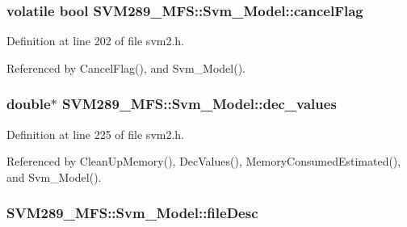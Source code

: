 \subsubsection[{\texorpdfstring{cancel\+Flag}{cancelFlag}}]{\setlength{\rightskip}{0pt plus 5cm}volatile bool S\+V\+M289\+\_\+\+M\+F\+S\+::\+Svm\+\_\+\+Model\+::cancel\+Flag}\hypertarget{struct_s_v_m289___m_f_s_1_1_svm___model_a01645368f6800875543d69ce8731d692}{}\label{struct_s_v_m289___m_f_s_1_1_svm___model_a01645368f6800875543d69ce8731d692}


Definition at line 202 of file svm2.\+h.



Referenced by Cancel\+Flag(), and Svm\+\_\+\+Model().

\subsubsection[{\texorpdfstring{dec\+\_\+values}{dec_values}}]{\setlength{\rightskip}{0pt plus 5cm}double$\ast$ S\+V\+M289\+\_\+\+M\+F\+S\+::\+Svm\+\_\+\+Model\+::dec\+\_\+values}\hypertarget{struct_s_v_m289___m_f_s_1_1_svm___model_a246da513040f5a6ab8c7cdd9dbf442f6}{}\label{struct_s_v_m289___m_f_s_1_1_svm___model_a246da513040f5a6ab8c7cdd9dbf442f6}


Definition at line 225 of file svm2.\+h.



Referenced by Clean\+Up\+Memory(), Dec\+Values(), Memory\+Consumed\+Estimated(), and Svm\+\_\+\+Model().

\subsubsection[{\texorpdfstring{file\+Desc}{fileDesc}}]{ S\+V\+M289\+\_\+\+M\+F\+S\+::\+Svm\+\_\+\+Model\+::file\+Desc}\hypertarget{struct_s_v_m289___m_f_s_1_1_svm___model_a60df40219f6193cae58891193aa1f44d}{}\label{struct_s_v_m289___m_f_s_1_1_svm___model_a60df40219f6193cae58891193aa1f44d}


